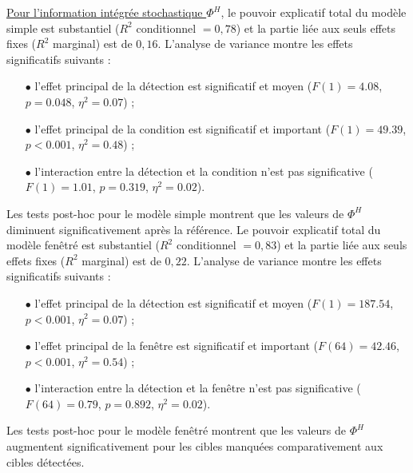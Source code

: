 \underline{Pour l'information intégrée stochastique $\Phi^{H}$}, le pouvoir explicatif total du modèle simple est substantiel ($R^2$ conditionnel $=0,78$) et la partie liée aux seuls effets fixes ($R^2$ marginal) est de $0,16$. 
L'analyse de variance montre les effets significatifs suivants :
\begin{itemize}
\item[$\bullet$] l'effet principal de la détection est significatif et moyen ($F(1)=4.08$, $p=0.048$, $\eta^2=0.07$) ; 
\item[$\bullet$] l'effet principal de la condition est significatif et important ($F(1)=49.39$, $p<0.001$, $\eta^2=0.48$) ; 
\item[$\bullet$] l'interaction entre la détection et la condition n'est pas significative ($F(1)=1.01$, $p=0.319$, $\eta^2=0.02$). 
\end{itemize}
Les tests post-hoc pour le modèle simple montrent que les valeurs de $\Phi^{H}$ diminuent significativement après la référence. 
Le pouvoir explicatif total du modèle fenêtré est substantiel ($R^2$ conditionnel $=0,83$) et la partie liée aux seuls effets fixes ($R^2$ marginal) est de $0,22$. 
L'analyse de variance montre les effets significatifs suivants : 
\begin{itemize}
\item[$\bullet$] l'effet principal de la détection est significatif et moyen ($F(1)=187.54$, $p<0.001$, $\eta^2=0.07$) ; 
\item[$\bullet$] l'effet principal de la fenêtre est significatif et important ($F(64)=42.46$, $p<0.001$, $\eta^2=0.54$) ; 
\item[$\bullet$] l'interaction entre la détection et la fenêtre n'est pas significative ($F(64)=0.79$, $p=0.892$, $\eta^2=0.02$). 
\end{itemize}
Les tests post-hoc pour le modèle fenêtré montrent que les valeurs de $\Phi^{H}$ augmentent significativement pour les cibles manquées comparativement aux cibles détectées. \\

